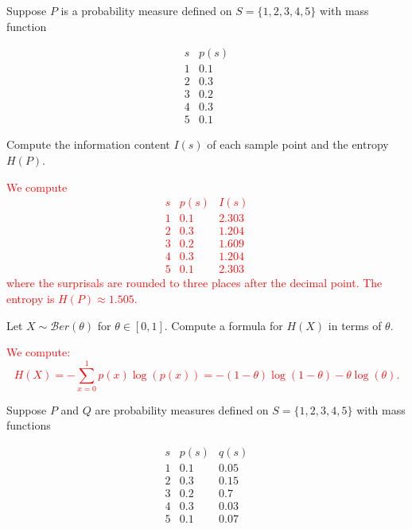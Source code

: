 \documentclass[12pt,reqno]{amsart}
\begin{document}
\bigskip

\prob Suppose $P$ is a probability measure defined on $S = \{1,2,3,4,5\}$ with mass function

	\[
	\begin{array}{c|c}
	s & p(s) \\ \hline
	1 & 0.1 \\
	2 & 0.3 \\
	3 & 0.2 \\
	4 & 0.3 \\
	5 & 0.1 
	\end{array}
	\]

Compute the information content $I(s)$ of each sample point and the entropy $H(P)$.

\bigskip
\textcolor{red}{We compute
	\[
	\begin{array}{c|cc}
	s & p(s) & I(s)\\ \hline
	1 & 0.1 & 2.303\\
	2 & 0.3 & 1.204\\
	3 & 0.2 & 1.609\\
	4 & 0.3 & 1.204\\
	5 & 0.1 & 2.303
	\end{array}
	\]
where the surprisals are rounded to three places after the decimal point. The entropy is $H(P) \approx 1.505$.}
\bigskip









\prob Let $X\sim \mathcal{B}er(\theta)$ for $\theta \in [0,1]$. Compute a formula for $H(X)$ in terms of $\theta$.

\bigskip
\textcolor{red}{We compute:
	\[H(X) = -\sum_{x=0}^1 p(x) \log(p(x)) = -(1-\theta) \log(1-\theta) - \theta \log(\theta).
	\]}
\bigskip









\prob Suppose $P$ and $Q$ are probability measures defined on $S = \{1,2,3,4,5\}$ with mass functions

	\[
	\begin{array}{c|cc}
	s & p(s) & q(s) \\ \hline
	1 & 0.1 & 0.05 \\
	2 & 0.3 & 0.15 \\
	3 & 0.2 & 0.7 \\
	4 & 0.3 & 0.03 \\
	5 & 0.1 & 0.07
	\end{array}
	\]
\end{document}
